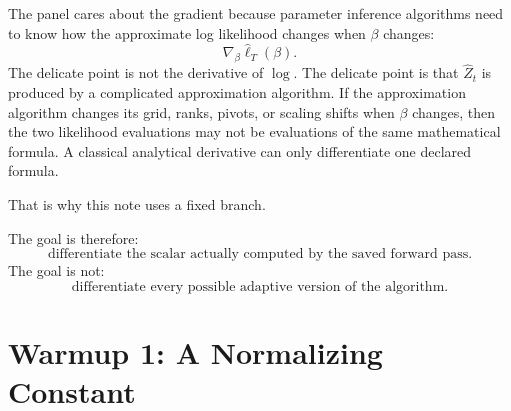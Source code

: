 \documentclass[11pt]{article}
\newcommand{\widehatell}{\widehat\ell}
\begin{document}
The panel cares about the gradient because parameter inference algorithms need
to know how the approximate log likelihood changes when \(\beta\) changes:
\[
    \nabla_\beta \widehatell_T(\beta).
    \label{eq:p24-p19-4}
\]
The delicate point is not the derivative of \(\log\).  The delicate point is
that \(\widehat Z_t\) is produced by a complicated approximation algorithm.  If
the approximation algorithm changes its grid, ranks, pivots, or scaling shifts
when \(\beta\) changes, then the two likelihood evaluations may not be
evaluations of the same mathematical formula.  A classical analytical
derivative can only differentiate one declared formula.

That is why this note uses a fixed branch.

\begin{center}
\end{center}

The goal is therefore:
\[
    \text{differentiate the scalar actually computed by the saved forward pass.}
    \label{eq:p24-p19-5}
\]
The goal is not:
\[
    \text{differentiate every possible adaptive version of the algorithm.}
    \label{eq:p24-p19-6}
\]

\section{Warmup 1: A Normalizing Constant}
\end{document}
